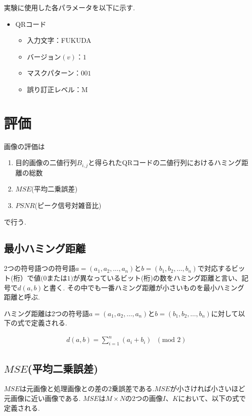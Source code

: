\documentclass{thesis}
\begin{document}
実験に使用した各パラメータを以下に示す.

\begin{itemize}
\setlength{\itemsep}{5mm}
 \item QRコード
    \begin{itemize}
      \item 入力文字：FUKUDA
      \item バージョン$(v)$：$1$
      \item マスクパターン：$001$
      \item 誤り訂正レベル：M
     \end{itemize}
  \end{itemize}


\section{評価}

画像の評価は
\begin{enumerate}
\item
目的画像の二値行列$B_{i,j}$と得られたQRコードの二値行列におけるハミング距離の総数
\item
$MSE$(平均二乗誤差)
\item
$PSNR$(ピーク信号対雑音比)
\end{enumerate}
で行う.

\subsection{最小ハミング距離}

2つの符号語つの符号語$a=(a_1,a_2,…,a_n)$と$b=(b_1,b_2,…,b_n)$で対応するビット(桁）で値$(0$または$1)$が異なっているビット(桁)の数をハミング距離と言い、記号で$d(a,b)$と書く.
その中でも一番ハミング距離が小さいものを最小ハミング距離と呼ぶ.

ハミング距離は2つの符号語$a=(a_1,a_2,…,a_n)$と$b=(b_1,b_2,…,b_n)$に対して以下の式で定義される.

\begin{eqnarray}
d(a,b)=\sum_{i=1}^{n}(a_{i}+b_{i})\mbox{ }(\mbox{mod } 2)
\end{eqnarray}


\subsection{$MSE$(平均二乗誤差)}

$MSE$は元画像と処理画像との差の2乗誤差である.$MSE$が小さければ小さいほど元画像に近い画像である.
$MSE$は$M \times N$の2つの画像$I、K$において、以下の式で定義される.
\end{document}
